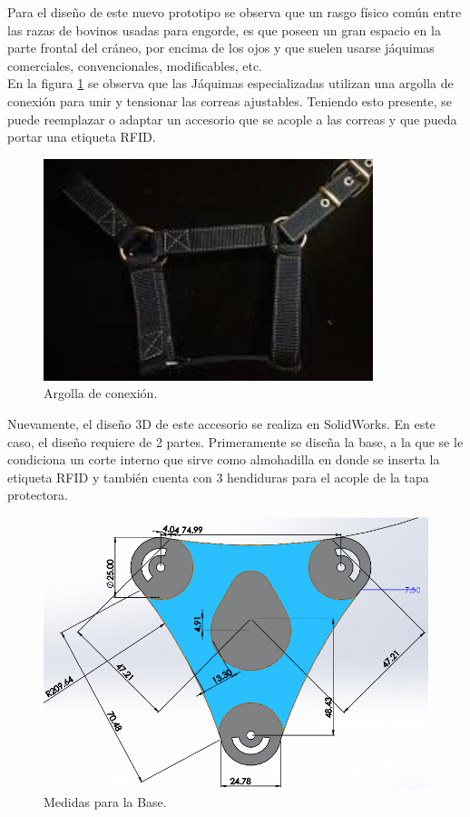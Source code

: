 Para el diseño de este nuevo prototipo se observa que un rasgo físico común entre las razas de bovinos usadas para engorde, es  que poseen un gran espacio en la parte frontal del cráneo, por encima de los ojos y que suelen usarse jáquimas comerciales, convencionales, modificables, etc.\\

En la figura \ref{argollapng} se observa que las Jáquimas especializadas utilizan una argolla de conexión para unir y tensionar las correas ajustables. Teniendo esto presente, se puede reemplazar o adaptar un accesorio que se acople a las correas y que pueda portar una etiqueta RFID.

		\begin{figure}[H]
		\begin{center}
			\includegraphics[scale=0.9]{img/argolla.png}
		\end{center}
		\caption{Argolla de conexión. \label{argollapng}}
		\end{figure}

Nuevamente, el diseño 3D de este accesorio se realiza en SolidWorks. En este caso, el diseño requiere de 2 partes. Primeramente se diseña la base, a la que se le condiciona un corte interno que sirve como almohadilla en donde se inserta la etiqueta RFID y también cuenta con 3 hendiduras para el acople de la tapa protectora.

        \begin{figure}[H]
		\begin{center}
			\includegraphics[scale=0.635]{img/medidasbase.png}
		\end{center}
		\caption{Medidas para la Base. \label{medidasbasepng}}
		\end{figure}

